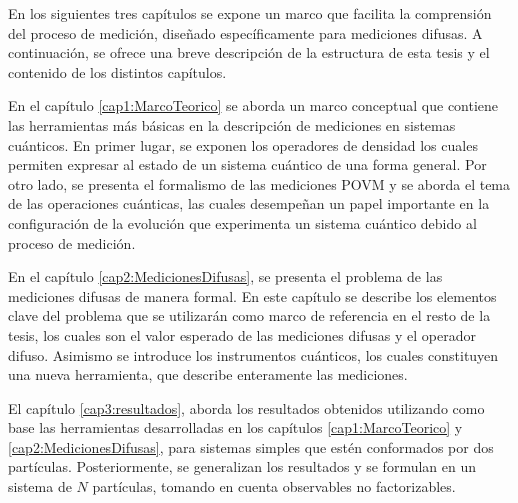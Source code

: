  En los siguientes  tres capítulos se expone un marco que facilita la comprensión del proceso de medición, diseñado específicamente para mediciones difusas. A continuación, se ofrece una breve descripción de la estructura de esta tesis y el contenido de los distintos capítulos. 

 En el capítulo {\ref{cap1:MarcoTeorico}} se aborda un marco conceptual que contiene las herramientas más básicas en la descripción de mediciones en sistemas cuánticos. En primer lugar, se exponen los operadores de densidad los cuales permiten expresar al estado de un sistema cuántico de una forma general. %
 Por otro lado, se presenta el formalismo de las mediciones POVM y se aborda el tema de las operaciones cuánticas, las cuales desempeñan un papel importante en la configuración de la evolución que experimenta un sistema cuántico debido al proceso de medición.


 En el capítulo {\ref{cap2:MedicionesDifusas}}, se presenta el problema de las mediciones difusas de manera formal.  En este capítulo se describe los elementos clave del problema que se utilizarán como marco de referencia en el resto de la tesis, los cuales son el valor esperado de las mediciones difusas y el operador difuso.  Asimismo se introduce los instrumentos cuánticos, los cuales constituyen una nueva herramienta, que describe enteramente las mediciones.


El capítulo {\ref{cap3:resultados}}, aborda los resultados obtenidos utilizando como base las herramientas desarrolladas en los capítulos {\ref{cap1:MarcoTeorico}} y {\ref{cap2:MedicionesDifusas}}, para sistemas simples que estén conformados por dos partículas. Posteriormente, se generalizan los resultados y se formulan en un sistema de $N$ partículas, tomando en cuenta observables no factorizables.






